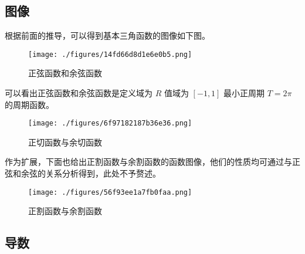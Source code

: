 \subsection{图像}
根据前面的推导，可以得到基本三角函数的图像如下图。
\begin{figure}[ht]
\centering
\texttt{[image: ./figures/14fd66d8d1e6e0b5.png]}
\caption{正弦函数和余弦函数} \label{fig_HsTFFv_1}
\end{figure}
可以看出正弦函数和余弦函数是定义域为 $R$ 值域为 $[-1,1]$ 最小正周期 $T = 2\pi$ 的周期函数。

\begin{figure}[ht]
\centering
\texttt{[image: ./figures/6f97182187b36e36.png]}
\caption{正切函数与余切函数} \label{fig_HsTFFv_3}
\end{figure}

作为扩展，下面也给出正割函数与余割函数的函数图像，他们的性质均可通过与正弦和余弦的关系分析得到，此处不予赘述。

\begin{figure}[ht]
\centering
\texttt{[image: ./figures/56f93ee1a7fb0faa.png]}
\caption{正割函数与余割函数} \label{fig_HsTFFv_2}
\end{figure}

\subsection{导数}